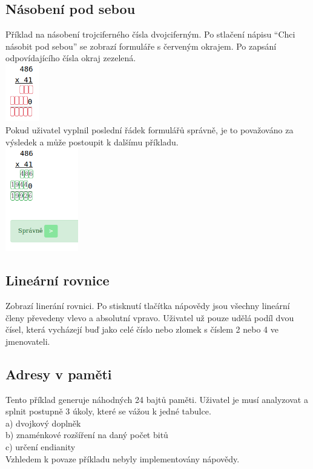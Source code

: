 \documentclass[
]{article}
\begin{document}
\subsection{Násobení pod sebou}

Příklad na násobení trojciferného čísla dvojciferným. Po stlačení nápisu
``Chci násobit pod sebou'' se zobrazí formuláře s červeným okrajem. Po
zapsání odpovídajícího čísla okraj zezelená.\\
\includegraphics[height=2.5cm]{../../doc-images/multiblank.png}\\
Pokud uživatel vyplnil
poslední řádek formulářů správně, je to považováno za výsledek a může
postoupit k dalšímu příkladu.\\
\includegraphics[height=4.5cm]{../../doc-images/multifull.png}\\

\subsection{Lineární rovnice}

Zobrazí linerání rovnici. Po stisknutí tlačítka nápovědy jsou všechny
lineární členy převedeny vlevo a absolutní vpravo. Uživatel už pouze
udělá podíl dvou čísel, která vycházejí buď jako celé číslo nebo zlomek
s číslem 2 nebo 4 ve jmenovateli.

\subsection{Adresy v paměti}

Tento příklad generuje náhodných 24 bajtů paměti. Uživatel je musí
analyzovat a splnit postupně 3 úkoly, které se vážou k jedné tabulce.\\
a) dvojkový doplněk\\
b) znaménkové rozšíření na daný počet bitů\\
c) určení endianity\\
Vzhledem k povaze příkladu nebyly implementovány nápovědy.
\end{document}
